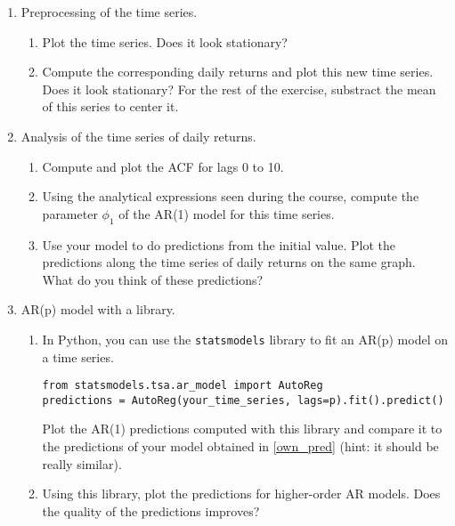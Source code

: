 \begin{enumerate}
    \item Preprocessing of the time series.
    \begin{enumerate}
        \item Plot the time series. Does it look stationary?
        \item Compute the corresponding daily returns and plot this new time series. Does it look stationary? For the rest of the exercise, substract the mean of this series to center it. 
    \end{enumerate}
    \item Analysis of the time series of daily returns.
    \begin{enumerate}
        \item Compute and plot the ACF for lags 0 to 10. 
        \item Using the analytical expressions seen during the course, compute the parameter $\phi_1$ of the AR(1) model for this time series.
        \item\label{own_pred} Use your model to do predictions from the initial value. Plot the predictions along the time series of daily returns on the same graph. What do you think of these predictions?
    \end{enumerate}
    \item AR(p) model with a library.
    \begin{enumerate}
        \item In Python, you can use the \texttt{statsmodels} library to fit an AR(p) model on a time series. 

\begin{verbatim}
from statsmodels.tsa.ar_model import AutoReg
predictions = AutoReg(your_time_series, lags=p).fit().predict()
\end{verbatim}
        
            Plot the AR(1) predictions computed with this library and compare it to the predictions of your model obtained in \ref{own_pred} (hint: it should be really similar). 

        \item Using this library, plot the predictions for higher-order AR models. Does the quality of the predictions improves?
    \end{enumerate}
\end{enumerate}
